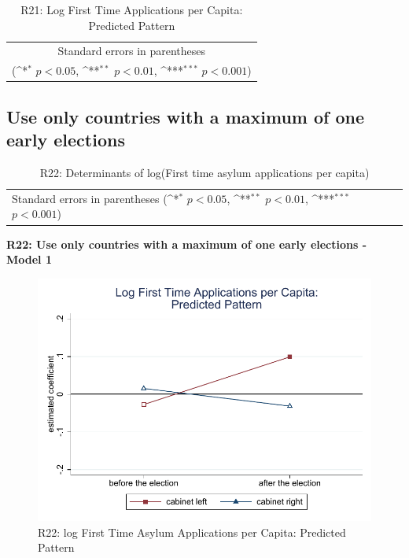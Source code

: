 \documentclass[10pt,a4paper]{scrartcl}
\begin{document}
\begin{table}[!ht]\centering
	\footnotesize
	\renewcommand{\arraystretch}{1.2}
	\def\sym#1{\ifmmode^{#1}\else\(^{#1}\)\fi}
	\caption{R21: Log First Time Applications per Capita: Predicted Pattern}
	\begin{tabular}{l*{2}{c}}
		\hline\hline
		
		\hline\hline
		\multicolumn{3}{c}{\footnotesize Standard errors in parentheses} \\
		\multicolumn{3}{c}{\footnotesize (\sym{*} \(p<0.05\), \sym{**} \(p<0.01\), \sym{***} \(p<0.001\))} \\
	\end{tabular}
\end{table}




\clearpage
\FloatBarrier
\subsection{Use only countries with a maximum of one early elections}
\begin{table}[!ht]\centering
	\renewcommand{\arraystretch}{1.25}
	\small
	\def\sym#1{\ifmmode^{#1}\else\(^{#1}\)\fi}
	\caption{R22: Determinants of log(First time asylum applications per capita)}
	\begin{tabular}{l*{3}{c}}
		\hline\hline
		
		\hline\hline
		\multicolumn{4}{l}{\footnotesize Standard errors in parentheses (\sym{*} \(p<0.05\), \sym{**} \(p<0.01\), \sym{***} \(p<0.001\))}\\
	\end{tabular}
\end{table}

\clearpage
\textbf{R22: Use only countries with a maximum of one early elections - Model 1}
\begin{figure}[!ht]
	\centering
	\includegraphics[width=1\textwidth]{figures_edited/app_graph1_R22.pdf}
	\caption{R22: log First Time Asylum Applications per Capita: Predicted Pattern}
\end{figure}
\end{document}
